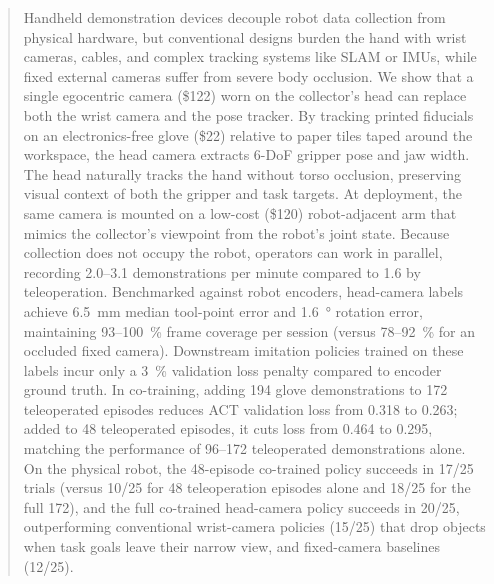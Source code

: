 \begin{abstract}
Handheld demonstration devices decouple robot data collection from physical hardware, but conventional designs burden the hand with wrist cameras, cables, and complex tracking systems like SLAM or IMUs, while fixed external cameras suffer from severe body occlusion. We show that a single egocentric camera (\$122) worn on the collector's head can replace both the wrist camera and the pose tracker. By tracking printed fiducials on an electronics-free glove (\$22) relative to paper tiles taped around the workspace, the head camera extracts 6-DoF gripper pose and jaw width. The head naturally tracks the hand without torso occlusion, preserving visual context of both the gripper and task targets. At deployment, the same camera is mounted on a low-cost (\$120) robot-adjacent arm that mimics the collector's viewpoint from the robot's joint state. Because collection does not occupy the robot, operators can work in parallel, recording 2.0--3.1 demonstrations per minute compared to 1.6 by teleoperation. Benchmarked against robot encoders, head-camera labels achieve \SI{6.5}{mm} median tool-point error and \SI{1.6}{\degree} rotation error, maintaining \SI{93}{}--\SI{100}{\percent} frame coverage per session (versus \SI{78}{}--\SI{92}{\percent} for an occluded fixed camera). Downstream imitation policies trained on these labels incur only a \SI{3}{\percent} validation loss penalty compared to encoder ground truth. In co-training, adding 194 glove demonstrations to 172 teleoperated episodes reduces ACT validation loss from 0.318 to 0.263; added to 48 teleoperated episodes, it cuts loss from 0.464 to 0.295, matching the performance of 96--172 teleoperated demonstrations alone. On the physical robot, the 48-episode co-trained policy succeeds in 17/25 trials (versus 10/25 for 48 teleoperation episodes alone and 18/25 for the full 172), and the full co-trained head-camera policy succeeds in 20/25, outperforming conventional wrist-camera policies (15/25) that drop objects when task goals leave their narrow view, and fixed-camera baselines (12/25).
\end{abstract}

